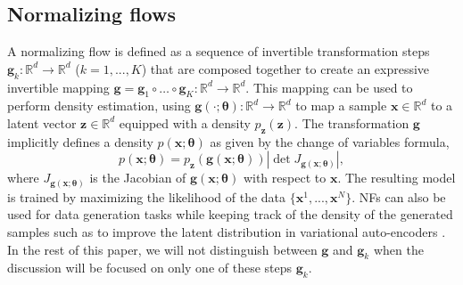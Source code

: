\documentclass{article}
\newcommand{\mb}{\boldsymbol}
\newcommand{\mbb}{\mathbb}
\newcommand{\antoine}[1]{\textcolor{orange}{[AW: #1]}}
\begin{document}
\subsection{Normalizing flows}
A normalizing flow is defined as a sequence of invertible transformation steps $\mb{g}_k : \mathbb{R}^d \to \mathbb{R}^d$  ($k=1, ..., K$) that are composed together to create an expressive invertible mapping $\mb{g} = \mb{g}_1 \circ \dots \circ \mb{g}_K : \mathbb{R}^d \to \mathbb{R}^d$. %
This mapping can be used to perform density estimation, using $\mb{g}(\cdot ;\mb{\theta}): \mbb{R}^d \rightarrow \mbb{R}^d$ to map a sample $\mb{x} \in \mathbb{R}^d$ to a latent vector $\mb{z} \in \mbb{R}^d$ equipped with a density $p_{\mb{z}}(\mb{z})$.
The transformation $\mb{g}$ implicitly defines a density $p(\mb{x}; \mb{\theta})$ as given by the change of variables formula,
\begin{equation*}
    p(\mb{x}; \mb{\theta}) = p_{\mb{z}}(\mb{g}(\mb{x};\mb{\theta})) \left| \det  J_{\mb{g}(\mb{x};\mb{\theta})} \right|, \label{eq:NF_DE}
\end{equation*}
where $J_{\mb{g}(\mb{x};\mb{\theta})}$ is the Jacobian of $\mb{g}(\mb{x};\mb{\theta})$ with respect to $\mb x$.
The resulting model is trained by maximizing the likelihood of the data $\{\mb{x}^1, ..., \mb{x}^N\}$. NFs can also be used for data generation tasks while keeping track of the density of the generated samples such as to improve the latent distribution in variational auto-encoders \citep{NF}.
In the rest of this paper, we will not distinguish between $\mb{g}$ and $\mb{g}_k$ when the discussion will be focused on only one of these steps $\mb{g}_k$.
\end{document}
